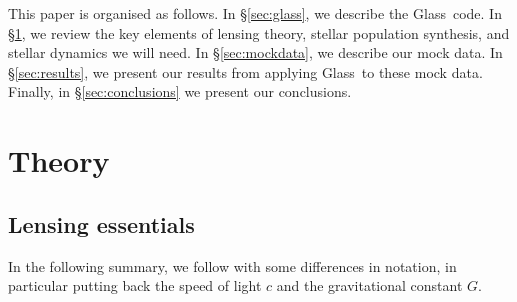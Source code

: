 \documentclass[galley,usenatbib]{mn2e}
\newcommand{\Glass}{{\sc Glass}}
\newcommand{\secref}[1] {\S\ref{#1}}
\begin{document}
This paper is organised as follows. In \secref{sec:glass}, we describe the
\Glass\ code. In \secref{sec:theory}, we review the key elements of lensing
theory, stellar population synthesis, and stellar dynamics we will need. In
\secref{sec:mockdata}, we describe our mock data. In \secref{sec:results}, we
present our results from applying \Glass\ to these mock data. Finally, in
\secref{sec:conclusions} we present our conclusions. 

\section{Theory}\label{sec:theory}

\subsection{Lensing essentials}\label{sec:lensing_basic}

In the following summary, we follow \cite{1986ApJ...310..568B} with
some differences in notation, in particular putting back the
speed of light $c$ and the gravitational constant $G$.
\end{document}
